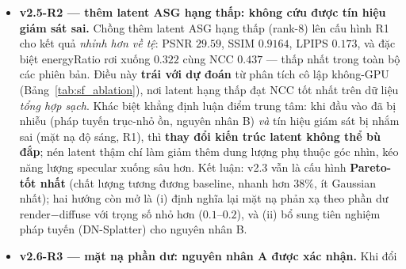 \begin{itemize}
{        bác bỏ ở dạng hiện tại.} Thêm số hạng L1 có trọng số trên top-3\% pixel sáng
        nhất (\texttt{spec\_loss\_weight}$=0.5$) \textit{không} cải thiện phản xạ mà
        còn làm xấu mọi chỉ số: PSNR $30.41\to 29.72$ ($-0.69$ dB), SSIM
        $0.9232\to 0.9182$, energyRatio $0.388\to 0.363$, NCC $0.529\to 0.475$. Đáng
        chú ý nhất, số Gaussian \textbf{tăng vọt} $588\text{k}\to 768\text{k}$
        ($+31\%$) và thời gian huấn luyện tăng lên $95\text{m}44\text{s}$. Nguyên nhân
        gốc của thất bại nằm ở \textit{cách định nghĩa mặt nạ}: mặt nạ dựa trên
        \textbf{độ sáng (luminance) của ảnh GT}, nên nó bắt nhầm các vùng
        \textit{khuếch tán sáng} (mặt bàn trắng, tường sáng) thay vì các highlight
        phản xạ thực sự. Trọng số phụ vì thế ép densification nhồi thêm hình học
        Lambertian vào vùng sáng --- đúng cơ chế đã thấy ở v2.4 nhưng mạnh hơn ---
        khiến mô hình phình to mà năng lượng specular vẫn tụt. Đây là một kết quả
        \textit{âm tính có giá trị}: nó cho thấy việc sửa nguyên nhân A đòi hỏi mặt nạ
        phải nhắm vào \textbf{phần dư phản xạ} (render $-$ diffuse), không phải độ sáng
        tuyệt đối.
        \item \textbf{v2.5-R2 --- thêm latent ASG hạng thấp: không cứu được tín hiệu
        giám sát sai.} Chồng thêm latent ASG hạng thấp (rank-8) lên cấu hình R1 cho
        kết quả \textit{nhỉnh hơn về tệ}: PSNR $29.59$, SSIM $0.9164$, LPIPS $0.173$,
        và đặc biệt energyRatio rơi xuống $0.322$ cùng NCC $0.437$ --- thấp nhất trong
        toàn bộ các phiên bản. Điều này \textbf{trái với dự đoán} từ phân tích cô lập
        không-GPU (Bảng~\ref{tab:sf_ablation}), nơi latent hạng thấp đạt NCC tốt nhất trên dữ liệu
        \textit{tổng hợp sạch}. Khác biệt khẳng định luận điểm trung tâm: khi đầu vào
        đã bị nhiễu (pháp tuyến trục-nhỏ ồn, nguyên nhân B) \textit{và} tín hiệu giám
        sát bị nhắm sai (mặt nạ độ sáng, R1), thì \textbf{thay đổi kiến trúc latent
        không thể bù đắp}; nén latent thậm chí làm giảm thêm dung lượng phụ thuộc góc
        nhìn, kéo năng lượng specular xuống sâu hơn. Kết luận: v2.3 vẫn là cấu hình
        \textbf{Pareto-tốt nhất} (chất lượng tương đương baseline, nhanh hơn $38\%$,
        ít Gaussian nhất); hai hướng còn mở là (i) định nghĩa lại mặt nạ phản xạ theo
        phần dư render$-$diffuse với trọng số nhỏ hơn ($0.1$--$0.2$), và (ii) bổ sung
        tiên nghiệm pháp tuyến (DN-Splatter) cho nguyên nhân B.
        \item \textbf{v2.6-R3 --- mặt nạ phần dư: nguyên nhân A được xác nhận.} Khi đổi

\end{itemize}
